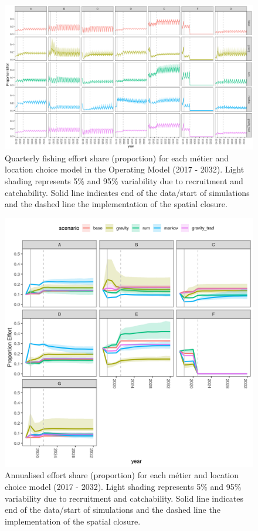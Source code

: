 \documentclass[12pt, halfline, a4paper]{ouparticle}
\begin{document}
\newpage

\begin{figure}
	\centering
	\includegraphics[width=1\linewidth]{figures/Effort_shares}
	\caption{Quarterly fishing effort share (proportion) for each métier
		and location choice model in the Operating Model (2017 - 2032). Light shading
		represents 5\% and 95\% variability due to recruitment and
		catchability. Solid line indicates end of the data/start of
		simulations and the dashed line the implementation of the
		spatial closure.} 
	\label{fig:effort}
\end{figure}	

\newpage

\begin{figure}[!ht]
	\centering
	\includegraphics[width=1\linewidth]{figures/Effort_shares_annual}
	\caption{Annualised effort share (proportion) for each métier
		and location choice model (2017 - 2032). Light shading
		represents 5\% and 95\% variability due to recruitment and
		catchability. Solid line indicates end of the data/start of
		simulations and the dashed line the implementation of the
		spatial closure.} 
	\label{fig:effort_an}
\end{figure}	
\end{document}
